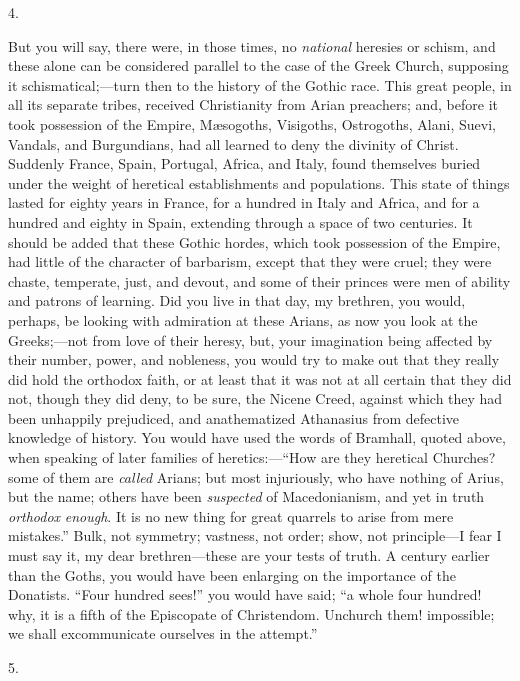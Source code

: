 4.

But you will say, there were, in those times, no \emph{national}
heresies or schism, and these alone can be considered parallel to the
case of the Greek Church, supposing it schismatical;—turn then to
the history of the Gothic race. This great people, in all its separate
tribes, received Christianity from Arian preachers; and, before it
took possession of the Empire, Mæsogoths, Visigoths, Ostrogoths,
Alani, Suevi, Vandals, and Burgundians, had all learned to deny the
divinity of Christ. Suddenly France, Spain, Portugal, Africa, and
Italy, found themselves buried under the weight of heretical
establishments and populations. This state of things lasted for eighty
years in France, for a hundred in Italy and Africa, and for a hundred
and eighty in Spain, extending through a space of two centuries. It
should be added that these Gothic hordes, which took possession of the
Empire, had little of the character of barbarism, except that they
were cruel; they were chaste, temperate, just, and devout, and some of
their princes were men of ability and patrons of learning. Did you
live in that day, my brethren, you would, perhaps, be looking with
admiration at these Arians, as now you look at the Greeks;—not from
love of their heresy, but, your imagination being affected by their
number, power, and nobleness, you would try to make out that they
really did hold the orthodox faith, or at least that it was not at all
certain that they did not, though they did deny, to be sure, the
Nicene Creed, against which they had been unhappily prejudiced, and
anathematized Athanasius from defective knowledge of history. You
would have used the words of Bramhall, quoted above, when speaking of
later families of heretics:—``How are they heretical Churches?
some of them are \emph{called} Arians; but most injuriously, who have
nothing of Arius, but the name; others have been \emph{suspected} of
Macedonianism, and yet in truth \emph{orthodox} \emph{enough}. It is no new
thing for great quarrels to arise from mere mistakes.'' Bulk, not
symmetry; vastness, not order; show, not principle—I fear I must say
it, my dear brethren—these are your tests of truth. A century
earlier than the Goths, you would have been enlarging on the
importance of the Donatists. ``Four hundred sees!'' you would
have said; ``a whole four hundred! why, it is a fifth of the
Episcopate of Christendom. Unchurch them! impossible; we shall
excommunicate ourselves in the attempt.''

5.

